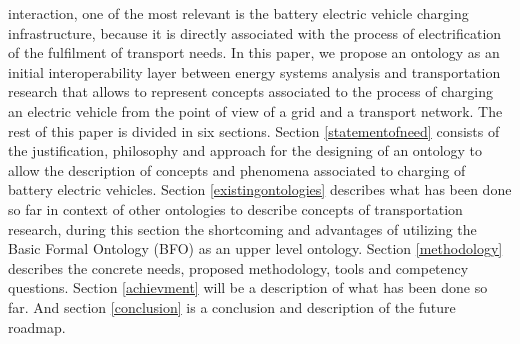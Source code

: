 interaction, one of the most relevant is the battery electric vehicle charging
infrastructure, because it is directly associated with the process of
electrification of the fulfilment of transport needs. In this paper, we propose
an ontology as an initial interoperability layer between energy systems
analysis and transportation research that allows to represent concepts
associated to the process of charging an electric vehicle from the point of
view of a grid and a transport network. The rest of this paper is divided in
six sections. Section \ref{statementofneed} consists of the justification,
philosophy and approach for the designing of an ontology to allow the
description of concepts and phenomena associated to charging of battery
electric vehicles. Section \ref{existingontologies} describes what has been
done so far in context of other ontologies to describe concepts of
transportation research, during this section the shortcoming and advantages of
utilizing the Basic Formal Ontology (BFO) \cite{Arp.2015} as an upper level
ontology. Section \ref{methodology} describes the concrete needs, proposed
methodology, tools and competency questions. Section \ref{achievment} will be a
description of what has been done so far. And section \ref{conclusion} is a
conclusion and description of the future roadmap.

